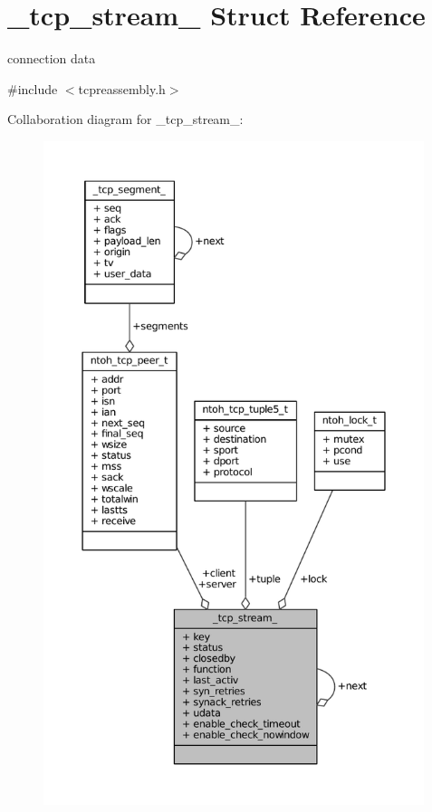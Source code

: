 \hypertarget{struct__tcp__stream__}{\section{\-\_\-tcp\-\_\-stream\-\_\- Struct Reference}
\label{struct__tcp__stream__}
}


connection data  




{\ttfamily \#include $<$tcpreassembly.\-h$>$}



Collaboration diagram for \-\_\-tcp\-\_\-stream\-\_\-\-:
\nopagebreak
\begin{figure}[H]
\begin{center}
\leavevmode
\includegraphics[height=550pt]{struct__tcp__stream____coll__graph}
\end{center}
\end{figure}
